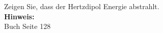 \begin{question}[section=5,subsection=51,name={Hertzdipol},difficulty=10,type=mdl,tags={}]
	Zeigen Sie, dass der Hertzdipol Energie abstrahlt.
	\\ \textbf{Hinweis:}\\
	Buch Seite 128
\end{question}
\begin{solution}
	
\end{solution}
